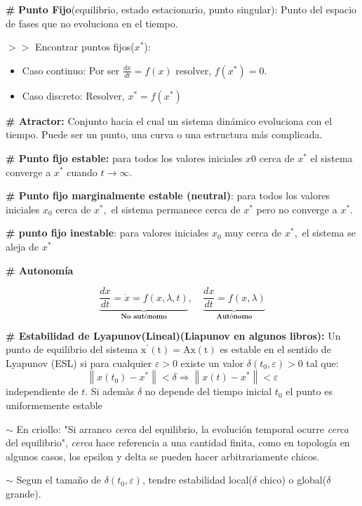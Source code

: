 \documentclass[%
 reprint,
 amsmath,amssymb,
 aps,
]{revtex4-1}
\begin{document}
\textbf{\#} \textbf{Punto Fijo}(equilibrio, estado estacionario, punto singular): Punto del espacio de fases que no evoluciona en el tiempo.

$>>$ Encontrar puntos fijos($x^*$):
\begin{itemize}
  \item Caso continuo: Por ser $\frac{dx}{dt}=f(x)$ resolver, $f(x^*) = 0$.
  \item Caso discreto: Resolver, $x^* = f(x^*)$
\end{itemize}

\textbf{\# Atractor:} Conjunto hacia el cual un sistema dinámico evoluciona con el tiempo. Puede ser un punto, una curva o una estructura más complicada.

\textbf{\# Punto fijo estable:} para todos los valores iniciales $x 0$ cerca de $x^{*}$ el sistema converge a $x^{*}$ cuando $t \rightarrow \infty .$

\textbf{\# Punto fijo marginalmente estable (neutral)}: para todos los valores iniciales $x_0$ cerca de $x^{*},$ el sistema permanece cerca de $x^{*}$ pero no converge a $x^{*}$.

\textbf{\# punto fijo inestable}: para valores iniciales $x_0$ muy cerca de $x^{*},$ el sistema se aleja de $x^{*}$

\textbf{\# Autonomía}

$$\underbrace{\frac{d x}{d t}=\dot{x}=f(x, \lambda, t) }_{\textbf{No autónomo}}
,\quad 
\underbrace{\frac{d x}{d t}=f(x, \lambda)}_{\textbf{Autónomo}}
$$

\textbf{\# Estabilidad de Lyapunov(Lineal)(Liapunov en algunos libros):} Un punto de equilibrio del sistema $\mathrm{x}^{\prime}(\mathrm{t})=\mathrm{Ax}(\mathrm{t})$ es estable en el sentido de Lyapunov (ESL) si para cualquier $\varepsilon>0$ existe un valor $\delta\left(t_{0}, \varepsilon\right)>0$ tal que:
$$
\left\|x\left(t_{0}\right)-x^{*}\right\|<\delta \Rightarrow\left\|x(t)-x^{*}\right\|<\varepsilon
$$
independiente de $t$. Si ademàs $\delta$ no depende del tiempo inicial $t_{0}$ el punto es uniformemente estable

$\sim$ En criollo: "Si arranco \textit{cerca} del equilibrio, la evolución temporal ocurre \textit{cerca} del equilibrio", \textit{cerca} hace referencia a una cantidad finita, como en topología en algunos casos, los epsilon y delta se pueden hacer arbitrariamente chicos.

$\sim$ Segun el tamaño de $\delta(t_0, \varepsilon)$, tendre estabilidad local($\delta$ chico) o global($\delta$ grande).
\end{document}
